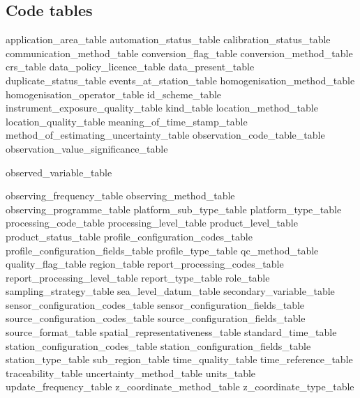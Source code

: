 \documentclass[a4paper,12pt]{article}
\begin{document}
\subsection {Code tables}
 {application_area_table} %
 {automation_status_table} %
 {calibration_status_table} %
 {communication_method_table} %
 {conversion_flag_table} %
 {conversion_method_table} %
 {crs_table} %
 {data_policy_licence_table} %
 {data_present_table} %
 {duplicate_status_table} %
 {events_at_station_table} %
 {homogenisation_method_table}
 {homogenisation_operator_table}
 {id_scheme_table} %
 {instrument_exposure_quality_table} %
 {kind_table} %
 {location_method_table} %
 {location_quality_table} %
 {meaning_of_time_stamp_table} %
 {method_of_estimating_uncertainty_table} %
 {observation_code_table_table} %
 {observation_value_significance_table} %
\begin{landscape}
 {observed_variable_table} %
\end{landscape}
 {observing_frequency_table} %
 {observing_method_table} %
 {observing_programme_table} %
 {platform_sub_type_table} %
 {platform_type_table} %
 {processing_code_table} %
 {processing_level_table} %
 {product_level_table} %
 {product_status_table} %
 {profile_configuration_codes_table}
 {profile_configuration_fields_table}
 {profile_type_table} %
 {qc_method_table}
 {quality_flag_table} %
 {region_table} %
 {report_processing_codes_table} %
 {report_processing_level_table} %
 {report_type_table} %
 {role_table} %
 {sampling_strategy_table} %
 {sea_level_datum_table} %
 {secondary_variable_table} %
 {sensor_configuration_codes_table} %
 {sensor_configuration_fields_table} %
 {source_configuration_codes_table} %
 {source_configuration_fields_table} %
 {source_format_table} %
 {spatial_representativeness_table} %
 {standard_time_table} %
 {station_configuration_codes_table} %
 {station_configuration_fields_table} %
 {station_type_table} %
 {sub_region_table} %
 {time_quality_table} %
 {time_reference_table} %
 {traceability_table} %
 {uncertainty_method_table}
 {units_table} %
 {update_frequency_table} %
 {z_coordinate_method_table} %
 {z_coordinate_type_table} %

   \clearpage
   \ifodd\value{page}\hbox{}\vspace*{\fill}\thispagestyle{empty}\newpage\fi


\end{document}
